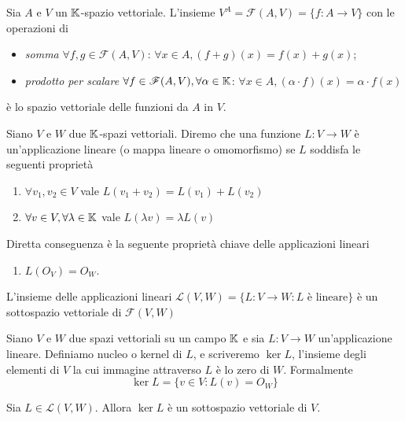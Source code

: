 
\begin{definition}
	Sia $ A $ e $ V $ un $ \mathbb{K} $-spazio vettoriale. L'insieme $ V^A = \mathscr{F}{(A, V)} = \{f \colon A \to V\} $ con le operazioni di
	\begin{itemize}
		\item \emph{somma} $ \forall f, g \in \mathscr{F}(A, V) $: $ \forall x \in A, (f + g)(x) = f(x) + g(x) $;
		\item \emph{prodotto per scalare} $ \forall f \in \mathscr{F}(A, V), \forall \alpha \in \mathbb{K} $: $ \forall x \in A, (\alpha \cdot f)(x) = \alpha \cdot f(x) $
	\end{itemize} 
	è lo spazio vettoriale delle funzioni da $ A $ in $ V $. 
\end{definition}

\begin{definition}
	Siano $ V $ e $ W $ due $ \mathbb{K} $-spazi vettoriali. Diremo che una funzione $ L \colon V \to W  $ è un'applicazione lineare (o mappa lineare o omomorfismo) se $ L $ soddisfa le seguenti proprietà
	\begin{enumerate}[label = (\roman*)]
		\item $ \forall v_1, v_2 \in V $ vale $ L(v_1 + v_2) = L(v_1) + L(v_2) $
		\item $ \forall v \in V, \forall \lambda \in \mathbb{K} $ vale $ L(\lambda v) = \lambda L(v)$
	\end{enumerate}
	Diretta conseguenza è la seguente proprietà chiave delle applicazioni lineari
	\begin{enumerate}[resume, label = (\roman*)]
		\item $ L(O_V) = O_W $.
	\end{enumerate}
	L'insieme delle applicazioni lineari $ \mathscr{L}{(V, W)} = \{L \colon V \to W : L \text{ è lineare}\} $ è un sottospazio vettoriale di $ \mathscr{F}{(V, W)} $
\end{definition}

\begin{definition}[nucleo]
	Siano $ V $ e $ W $ due spazi vettoriali su un campo $ \mathbb{K} $ e sia $ L \colon V \to W  $ un'applicazione lineare. Definiamo nucleo o kernel di $ L $, e scriveremo $ \ker{L}$, l'insieme degli elementi di $ V $ la cui immagine attraverso $ L $ è lo zero di $ W $. Formalmente \[\ker{L} = \{v \in V \colon L(v) = O_W\} \]
\end{definition}

\begin{thm}
	Sia $ L \in \mathscr{L}{(V, W)} $. Allora $ \ker{L} $ è un sottospazio vettoriale di $ V $.
\end{thm}

